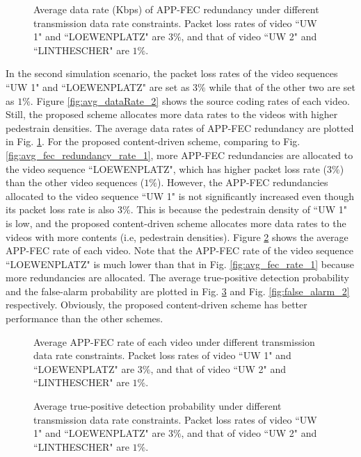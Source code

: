 \documentclass[journal]{IEEEtran}
\begin{document}
\begin{figure}[t]
\caption{Average data rate (Kbps) of APP-FEC redundancy under different transmission data rate constraints. Packet loss rates of video ``UW 1" and ``LOEWENPLATZ" are $3\%$, and that of video ``UW 2" and ``LINTHESCHER" are $1\%$.}\label{fig:avg_fec_redundancy_rate_2}
\end{figure}
In the second simulation scenario, the packet loss rates of the video sequences ``UW 1" and ``LOEWENPLATZ" are set as $3\%$ while that of the other two are set as $1\%$. Figure \ref{fig:avg_dataRate_2} shows the source coding rates of each video. Still, the proposed scheme allocates more data rates to the videos with higher pedestrain densities. The average data rates of APP-FEC redundancy are plotted in Fig. \ref{fig:avg_fec_redundancy_rate_2}. For the proposed content-driven scheme, comparing to Fig. \ref{fig:avg_fec_redundancy_rate_1}, more APP-FEC redundancies are allocated to the video sequence ``LOEWENPLATZ", which has higher packet loss rate ($3\%$) than the other video sequences ($1\%$). However, the APP-FEC redundancies allocated to the video sequence ``UW 1" is not significantly increased even though its packet loss rate is also $3\%$. This is because the pedestrain density of ``UW 1" is low, and the proposed content-driven scheme allocates more data rates to the videos with more contents (i.e, pedestrain densities). Figure \ref{fig:avg_fec_rate_2} shows the average APP-FEC rate of each video. Note that the APP-FEC rate of the video sequence ``LOEWENPLATZ" is much lower than that in Fig. \ref{fig:avg_fec_rate_1} because more redundancies are allocated. The average true-positive detection probability and the false-alarm probability are plotted in Fig. \ref{fig:true_positive_2} and Fig. \ref{fig:false_alarm_2} respectively. Obviously, the proposed content-driven scheme has better performance than the other schemes. 


\begin{figure}[t]
\caption{Average APP-FEC rate of each video under different transmission data rate constraints. Packet loss rates of video ``UW 1" and ``LOEWENPLATZ" are $3\%$, and that of video ``UW 2" and ``LINTHESCHER" are $1\%$.}\label{fig:avg_fec_rate_2}
\end{figure}


\begin{figure}[t]
\caption{Average true-positive detection probability under different transmission data rate constraints. Packet loss rates of video ``UW 1" and ``LOEWENPLATZ" are $3\%$, and that of video ``UW 2" and ``LINTHESCHER" are $1\%$.}\label{fig:true_positive_2}
\end{figure}
\end{document}
